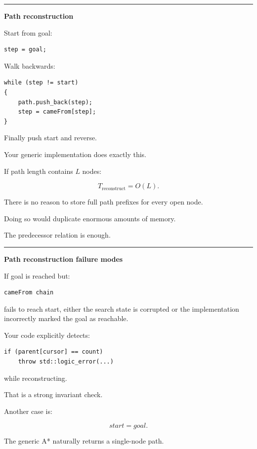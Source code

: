 \begin{center}\rule{0.5\linewidth}{0.5pt}\end{center}

\textbf{Path reconstruction}

Start from goal:

\begin{verbatim}
step = goal;
\end{verbatim}

Walk backwards:

\begin{verbatim}
while (step != start)
{
    path.push_back(step);
    step = cameFrom[step];
}
\end{verbatim}

Finally push start and reverse.

Your generic implementation does exactly this.

If path length contains \(L\) nodes:

\[
T_{\text{reconstruct}}
=
O(L).
\]

There is no reason to store full path prefixes for every open node.

Doing so would duplicate enormous amounts of memory.

The predecessor relation is enough.

\begin{center}\rule{0.5\linewidth}{0.5pt}\end{center}

\textbf{Path reconstruction failure modes}

If goal is reached but:

\begin{verbatim}
cameFrom chain
\end{verbatim}

fails to reach start, either the search state is corrupted or the implementation incorrectly marked the goal as reachable.

Your  code explicitly detects:

\begin{verbatim}
if (parent[cursor] == count)
    throw std::logic_error(...)
\end{verbatim}

while reconstructing.

That is a strong invariant check.

Another case is:

\[
start=goal.
\]

The generic A* naturally returns a single-node path.

